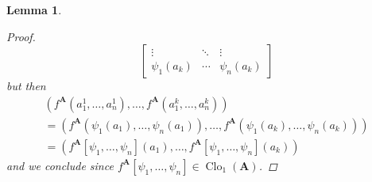 \documentclass{amsart}
\theoremstyle{plain}
\newtheorem{lemma}[theorem]{Lemma}
\theoremstyle{definition}
\theoremstyle{remark}
\DeclareMathOperator{\Clo}{Clo}
\begin{document}
\begin{lemma}
\begin{proof}
\begin{equation*}
\begin{bmatrix}
              \vdots & \ddots &  \vdots  \\
              \psi_1(a_k) & \cdots & \psi_n(a_k)
              \end{bmatrix}
          \end{equation*}
          but then 
        \begin{multline*}
            (f^{\mathbf{A}}(a_1^1, \ldots, a^1_n), \ldots,f^{\mathbf{A}}(a^k_1, \ldots, a^k_n))\\
             = (f^{\mathbf{A}}(\psi_1(a_1), \ldots, \psi_n(a_1)), \ldots,f^{\mathbf{A}}(\psi_1(a_k), \ldots, \psi_n(a_k))) \\
             = (f^{\mathbf{A}}[\psi_1, \ldots, \psi_n](a_1), \ldots, f^{\mathbf{A}}[\psi_1, \ldots, \psi_n](a_k))
        \end{multline*}
        and we conclude since $f^{\mathbf{A}}[\psi_1, \ldots, \psi_n] \in \Clo_1(\mathbf{A})$. 
    \end{proof}
\end{lemma}
\end{document}
